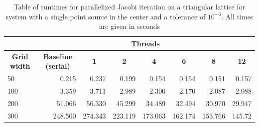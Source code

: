 \documentclass[paper=a4, fontsize=11pt]{scrartcl} %
\numberwithin{equation}{section} %
\numberwithin{figure}{section} %
\numberwithin{table}{section} %
\begin{document}
\begin{table}[h, scale=0.4]
\centering
\caption{Table of runtimes for parallelized Jacobi iteration on a triangular lattice for system with a single point source in the center and a tolerance of $10^{-6}$. All times are given in seconds}
\label{tab:tltimings}
\begin{adjustbox}{max width=\textwidth}
\begin{tabular}{l|r|r|r|r|r|r|r|}
\cline{2-8}
                                          & \multicolumn{7}{c|}{\textbf{Threads}}                                                                                                                                                                                                                        \\ \hline
\multicolumn{1}{|c|}{\textbf{Grid width}} & \multicolumn{1}{c|}{\textbf{Baseline (serial)}} & \multicolumn{1}{c|}{\textbf{1}} & \multicolumn{1}{c|}{\textbf{2}} & \multicolumn{1}{c|}{\textbf{4}} & \multicolumn{1}{c|}{\textbf{6}} & \multicolumn{1}{c|}{\textbf{8}} & \multicolumn{1}{c|}{\textbf{12}} \\ \hline
\multicolumn{1}{|l|}{50}                  & 0.215                                           & 0.237                           & 0.199                           & 0.154                           & 0.154                           & 0.151                           & 0.157                            \\ \hline
\multicolumn{1}{|l|}{100}                 & 3.359                                           & 3.711                           & 2.989                           & 2.300                           & 2.170                           & 2.087                           & 2.088                            \\ \hline
\multicolumn{1}{|l|}{200}                 & 51.066                                          & 56.330                          & 45.299                          & 34.489                          & 32.494                          & 30.970                          & 29.947                           \\ \hline
\multicolumn{1}{|l|}{300}                 & 248.500                                         & 274.343                         & 223.119                         & 173.063                         & 162.174                         & 153.766                         & 145.72                           \\ \hline
\end{tabular}
\end{adjustbox}
\end{table}
\end{document}
